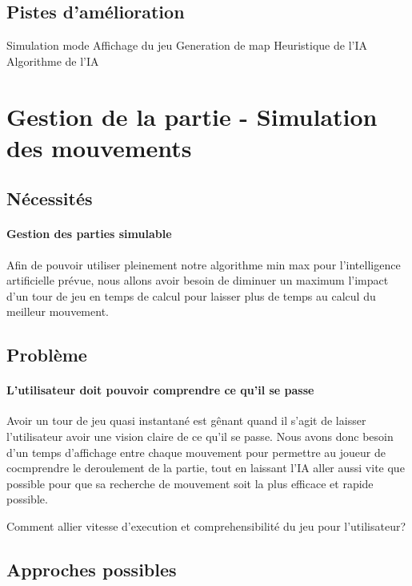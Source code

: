 \documentclass{scratcl}
\begin{document}
    \subsection{Pistes d'amélioration}



    Simulation mode
    Affichage du jeu
    Generation de map
    Heuristique de l'IA
    Algorithme de l'IA



    \section{Gestion de la partie - Simulation des mouvements}

    \subsection{Nécessités}

    \paragraph{Gestion des parties simulable}
    Afin de pouvoir utiliser pleinement notre algorithme min max pour
    l'intelligence artificielle prévue, nous allons avoir besoin de diminuer
    un maximum l'impact d'un tour de jeu en temps de calcul pour laisser plus
    de temps au calcul du meilleur mouvement.

    \subsection{Problème}

    \paragraph{L'utilisateur doit pouvoir comprendre ce qu'il se passe}
    Avoir un tour de jeu quasi instantané est gênant quand il s'agit de
    laisser l'utilisateur avoir une vision claire de ce qu'il se passe.
    Nous avons donc besoin d'un temps d'affichage entre chaque mouvement pour
    permettre au joueur de cocmprendre le deroulement de la partie, tout en
    laissant l'IA aller aussi vite que possible pour que sa recherche de
    mouvement soit la plus efficace et rapide possible.

    Comment allier vitesse d'execution et comprehensibilité du jeu pour
    l'utilisateur?

    \subsection{Approches possibles}
\end{document}
